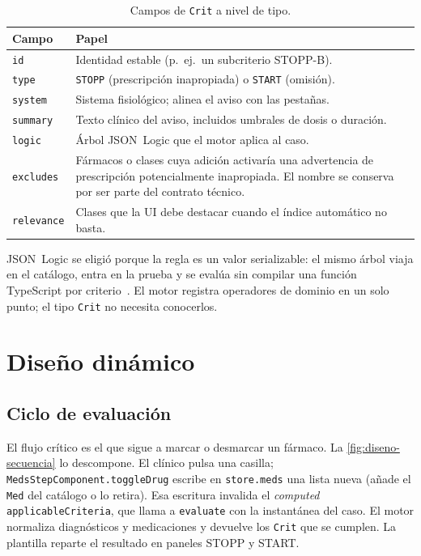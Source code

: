 \begin{table}[H]
  \centering
  \scriptsize
  \begin{tabular}{@{}lp{10.2cm}@{}}
    \toprule
    \textbf{Campo} & \textbf{Papel} \\
    \midrule
    \texttt{id} &
      Identidad estable (p.~ej.\ un subcriterio STOPP-B). \\
    \texttt{type} &
      \texttt{STOPP} (prescripción inapropiada) o \texttt{START}
      (omisión). \\
    \texttt{system} &
      Sistema fisiológico; alinea el aviso con las pestañas. \\
    \texttt{summary} &
      Texto clínico del aviso, incluidos umbrales de dosis o duración. \\
    \texttt{logic} &
      Árbol JSON~Logic que el motor aplica al caso. \\
    \texttt{excludes} &
      Fármacos o clases cuya adición activaría una advertencia de
      prescripción potencialmente inapropiada. El nombre se conserva
      por ser parte del contrato técnico. \\
    \texttt{relevance} &
      Clases que la UI debe destacar cuando el índice automático no
      basta. \\
    \bottomrule
  \end{tabular}
  \caption{Campos de \texttt{Crit} a nivel de tipo.}
  \label{tab:diseno-crit}
\end{table}

JSON~Logic se eligió porque la regla es un valor serializable: el
mismo árbol viaja en el catálogo, entra en la prueba y se evalúa sin
compilar una función TypeScript por criterio~\cite{jsonlogic}. El
motor registra operadores de dominio en un solo punto; el tipo
\texttt{Crit} no necesita conocerlos.

\section{Diseño dinámico}

\subsection{Ciclo de evaluación}

El flujo crítico es el que sigue a marcar o desmarcar un fármaco. La
\cref{fig:diseno-secuencia} lo descompone. El clínico pulsa una
casilla; \texttt{MedsStepComponent.toggleDrug} escribe en
\texttt{store.meds} una lista nueva (añade el \texttt{Med} del
catálogo o lo retira). Esa escritura invalida el
\textit{computed} \texttt{applicableCriteria}, que llama a
\texttt{evaluate} con la instantánea del caso. El motor normaliza
diagnósticos y medicaciones y devuelve los \texttt{Crit} que se
cumplen. La plantilla reparte el resultado en paneles STOPP y START.

